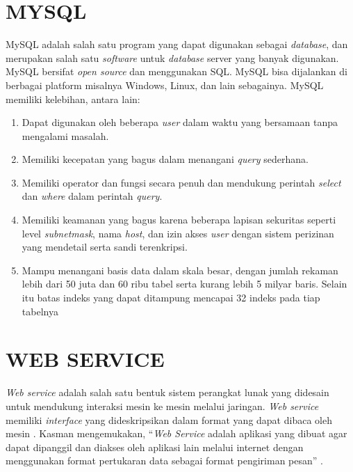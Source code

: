 
\section{\uppercase{MySQL}}
MySQL adalah salah satu program yang dapat digunakan sebagai \textit{database}, dan merupakan salah satu \textit{software} untuk \textit{database} server yang banyak digunakan. MySQL bersifat \textit{open source} dan menggunakan SQL. MySQL bisa dijalankan di berbagai platform misalnya Windows, Linux, dan lain sebagainya. MySQL memiliki kelebihan, antara lain: \citep{orlando2017aplikasi}

\begin{enumerate}
	\item Dapat digunakan oleh beberapa \textit{user} dalam waktu yang bersamaan tanpa mengalami masalah.	
	\item Memiliki kecepatan yang bagus dalam menangani \textit{query} sederhana.
	\item Memiliki operator dan fungsi secara penuh dan mendukung perintah \textit{select} dan \textit{where} dalam perintah \textit{query}.
	\item Memiliki keamanan yang bagus karena beberapa lapisan sekuritas seperti level \textit{subnetmask}, nama \textit{host}, dan izin akses \textit{user} dengan sistem perizinan yang mendetail serta sandi terenkripsi.
	\item Mampu menangani basis data dalam skala besar, dengan jumlah rekaman lebih dari 50 juta dan 60 ribu tabel serta kurang lebih 5 milyar baris. Selain itu batas indeks yang dapat ditampung mencapai 32 indeks pada tiap tabelnya
\end{enumerate}

\section{\uppercase{Web Service}}
\textit{Web service} adalah salah satu bentuk sistem perangkat lunak yang didesain untuk mendukung interaksi mesin ke mesin melalui jaringan. \textit{Web service} memiliki \textit{interface} yang dideskripsikan dalam format yang dapat dibaca oleh mesin \citep{prabowo2016teknologi}. Kasman mengemukakan, “\textit{Web Service} adalah aplikasi yang dibuat agar dapat dipanggil dan diakses oleh aplikasi lain melalui internet dengan menggunakan format pertukaran data sebagai format pengiriman pesan” \citep{kasman2015}.

